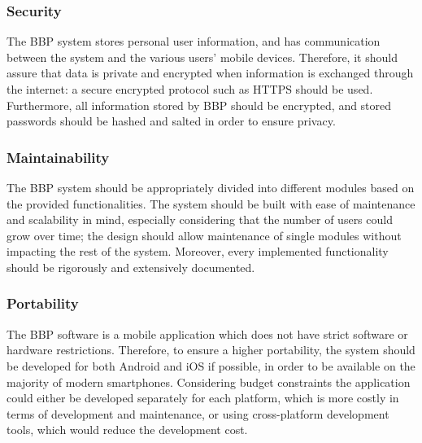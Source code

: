 \subsubsection{Security}
The BBP system stores personal user information, and has communication between the 
system and the various users’ mobile devices. Therefore, it should assure that data 
is private and encrypted when information is exchanged through the internet: a secure 
encrypted protocol such as HTTPS should be used. Furthermore, all information stored 
by BBP should be encrypted, and stored passwords should be hashed and salted in order 
to ensure privacy.

\subsubsection{Maintainability}
The BBP system should be appropriately divided into different modules based on the provided 
functionalities. The system should be built with ease of maintenance and scalability in 
mind, especially considering that the number of users could grow over time; the design should allow maintenance of single modules without impacting the rest of the system. Moreover, every implemented functionality should be rigorously and extensively documented.

\subsubsection{Portability}
The BBP software is a mobile application which does not have strict software or 
hardware restrictions. Therefore, to ensure a higher portability, the system should 
be developed for both Android and iOS if possible, in order to be available on the 
majority of modern smartphones. Considering budget constraints the application could 
either be developed separately for each platform, which is more costly in terms of 
development and maintenance, or using cross-platform development tools, which would 
reduce the development cost.

